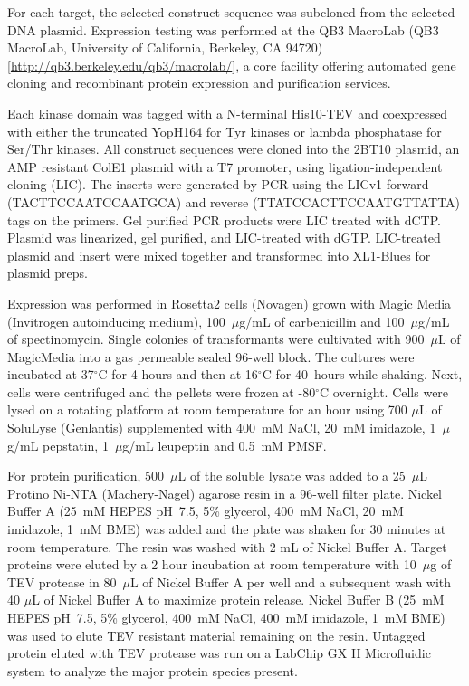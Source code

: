 \documentclass[9pt,lineno]{elife}
\begin{document}
For each target, the selected construct sequence was subcloned from the selected DNA plasmid.
Expression testing was performed at the QB3 MacroLab (QB3 MacroLab, University of California, Berkeley, CA 94720) [\url{http://qb3.berkeley.edu/qb3/macrolab/}], a core facility offering automated gene cloning and recombinant protein expression and purification services.

Each kinase domain was tagged with a N-terminal His10-TEV and coexpressed with either the truncated YopH164 for Tyr kinases or lambda phosphatase for Ser/Thr kinases.
All construct sequences were cloned into the 2BT10 plasmid, an AMP resistant ColE1 plasmid with a T7 promoter, using ligation-independent cloning (LIC).
The inserts were generated by PCR using the LICv1 forward (TACTTCCAATCCAATGCA) and reverse (TTATCCACTTCCAATGTTATTA) tags on the primers.
Gel purified PCR products were LIC treated with dCTP. 
Plasmid was linearized, gel purified, and LIC-treated with dGTP.
LIC-treated plasmid and insert were mixed together and transformed into XL1-Blues for plasmid preps. 

Expression was performed in Rosetta2 cells (Novagen) 
grown with Magic Media (Invitrogen autoinducing medium), 100~$\mu$g/mL of carbenicillin and 100~$\mu$g/mL of spectinomycin. 
Single colonies of transformants were cultivated with 900~$\mu$L of MagicMedia into a gas permeable sealed 96-well block. 
The cultures were incubated at 37$^\circ$C for 4 hours and then at 16$^\circ$C for 40~hours while shaking. 
Next, cells were centrifuged and the pellets were frozen at -80$^\circ$C overnight. 
Cells were lysed on a rotating platform at room temperature for an hour using 700 $\mu$L of SoluLyse (Genlantis) supplemented with 400~mM NaCl, 20~mM imidazole, 1~$\mu$g/mL pepstatin, 1~$\mu$g/mL leupeptin and 0.5~mM PMSF. 

For protein purification, 500~$\mu$L of the soluble lysate was added to a 25~$\mu$L Protino Ni-NTA (Machery-Nagel) agarose resin in a 96-well filter plate. 
Nickel Buffer A (25~mM HEPES pH~7.5, 5\% glycerol, 400~mM NaCl, 20~mM imidazole, 1~mM BME) was added and the plate was shaken for 30 minutes at room temperature. 
The resin was washed with 2 mL of Nickel Buffer A. 
Target proteins were eluted by a 2 hour incubation at room temperature with 10~$\mu$g of TEV protease in 80~$\mu$L of Nickel Buffer A per well and a subsequent wash with 40 $\mu$L of Nickel Buffer A to maximize protein release. 
Nickel Buffer B (25~mM HEPES pH~7.5, 5\% glycerol, 400~mM NaCl, 400~mM imidazole, 1~mM BME) was used to elute TEV resistant material remaining on the resin.
Untagged protein eluted with TEV protease was run on a LabChip GX II Microfluidic system to analyze the major protein species present. 
\end{document}
